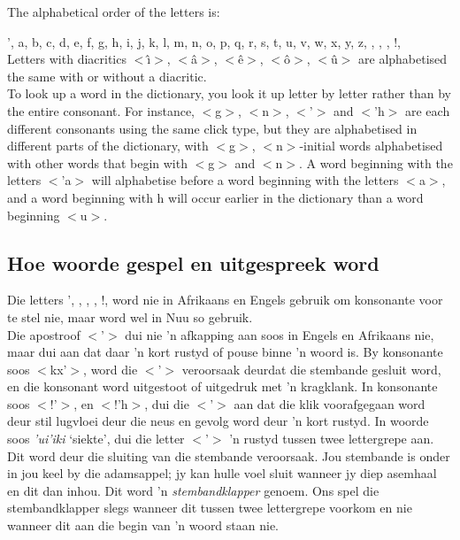 The alphabetical order of the letters is:

', a, b, c, d, e, f, g, h, i, j, k, l, m, n, o, p, q, r, s, t, u, v,
w, x, y, z, , \textipa{\textvertline},
\textipa{\textdoublevertline}, !, \textipa{\textdoublebarpipe}\\

Letters with diacritics $<$\^{\i}$>$, $<$\^{a}$>$, $<$\^{e}$>$,
$<$\^{o}$>$, $<$\^{u}$>$ are alphabetised the same with or without a
diacritic.\\

To look up a word in the dictionary, you look it up letter by letter
rather than by the entire consonant. For instance,
$<$g\textipa{\textdoublebarpipe}$>$,
$<$n\textipa{\textdoublebarpipe}$>$,
$<$\textipa{\textdoublebarpipe}'$>$ and
$<$\textipa{\textdoublebarpipe}'h$>$ are each different consonants
using the same click type, but they are alphabetised in different
parts of the dictionary, with $<$g\textipa{\textdoublebarpipe}$>$,
$<$n\textipa{\textdoublebarpipe}$>$-initial words alphabetised with
other words that begin with $<$g$>$ and $<$n$>$. A word beginning with
the letters $<$\textipa{\textdoublebarpipe}'a$>$ will alphabetise
before a word beginning with the letters
$<$\textipa{\textdoublebarpipe}a$>$, and a word beginning with
\textipa{\textdoublebarpipe}h will occur earlier in the dictionary
than a word beginning $<$\textipa{\textdoublebarpipe}u$>$.\\


\markboth{}{}
\subsection{Hoe woorde gespel en uitgespreek word}
\label{s:spelling_a}
\markboth{}{}

Die letters ', , \textipa{\textvertline},
\textipa{\textdoublevertline}, !, \textipa{\textdoublebarpipe} word
nie in Afrikaans en Engels gebruik om konsonante voor te stel nie,
maar word wel in N\textipa{\textvertline}uu so gebruik.\\

Die apostroof $<$'$>$ dui nie 'n afkapping aan soos in Engels en
Afrikaans nie, maar dui aan dat daar 'n kort rustyd of pouse binne 'n
woord is. By konsonante soos $<$kx'$>$, word die $<$'$>$ veroorsaak
deurdat die stembande gesluit word, en die konsonant word uitgestoot
of uitgedruk met 'n kragklank. In konsonante soos $<$!'$>$, en
$<$!'h$>$, dui die $<$'$>$ aan dat die klik voorafgegaan word deur
stil lugvloei deur die neus en gevolg word deur 'n kort rustyd. In
woorde soos \emph{'ui'iki} `siekte', dui die letter
$<$'$>$ 'n rustyd tussen twee lettergrepe aan. Dit word deur die
sluiting van die stembande veroorsaak. Jou stembande is onder in jou
keel by die adamsappel; jy kan hulle voel sluit wanneer jy diep
asemhaal en dit dan inhou. Dit word 'n \emph{stembandklapper} genoem.
Ons spel die stembandklapper slegs wanneer dit tussen twee lettergrepe
voorkom en nie wanneer dit aan die begin van 'n woord staan nie.\\


